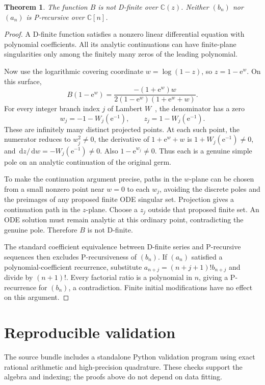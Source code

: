 \documentclass[11pt,letterpaper]{article}
\newtheorem{theorem}{Theorem}[section]
\theoremstyle{remark}\newtheorem{remark}[theorem]{Remark}
\newcommand{\dd}{\,\mathrm d}
\newcommand{\ee}{\mathrm e}
\newcommand{\C}{\mathbb C}
\begin{document}
\begin{theorem}\label{ccp:thm:nondfinite}
The function $B$ is not D-finite over $\C(z)$. Neither $(b_n)$ nor $(a_n)$ is P-recursive over $\C[n]$.
\end{theorem}
\begin{proof}
A D-finite function satisfies a nonzero linear differential equation with polynomial coefficients. All its analytic continuations can have finite-plane singularities only among the finitely many zeros of the leading polynomial.

Now use the logarithmic covering coordinate $w=\log(1-z)$, so $z=1-\ee^w$. On this surface,
\[
B(1-\ee^w)=\frac{-(1+\ee^w)w}{2(1-\ee^w)(1+\ee^w+w)}.
\]
For every integer branch index $j$ of Lambert $W$~\cite[Section 4.13]{dlmf}, the denominator has a zero
\[
w_j=-1-W_j(\ee^{-1}),\qquad z_j=1-W_j(\ee^{-1}).
\]
These are infinitely many distinct projected points. At each such point, the numerator reduces to $w_j^2\ne0$, the derivative of $1+\ee^w+w$ is $1+W_j(\ee^{-1})\ne0$, and $\dd z/\dd w=-W_j(\ee^{-1})\ne0$. Also $1-\ee^{w_j}\ne0$. Thus each is a genuine simple pole on an analytic continuation of the original germ.

To make the continuation argument precise, paths in the $w$-plane can be chosen from a small nonzero point near $w=0$ to each $w_j$, avoiding the discrete poles and the preimages of any proposed finite ODE singular set. Projection gives a continuation path in the $z$-plane. Choose a $z_j$ outside that proposed finite set. An ODE solution must remain analytic at this ordinary point, contradicting the genuine pole. Therefore $B$ is not D-finite.

The standard coefficient equivalence between D-finite series and P-recursive sequences then excludes P-recursiveness of $(b_n)$. If $(a_n)$ satisfied a polynomial-coefficient recurrence, substitute $a_{n+j}=(n+j+1)!b_{n+j}$ and divide by $(n+1)!$. Every factorial ratio is a polynomial in $n$, giving a P-recurrence for $(b_n)$, a contradiction. Finite initial modifications have no effect on this argument.
\end{proof}

\section{Reproducible validation}\label{ccp:sec:validation}
The source bundle includes a standalone Python validation program using exact rational arithmetic and high-precision quadrature. These checks support the algebra and indexing; the proofs above do not depend on data fitting.
\end{document}
